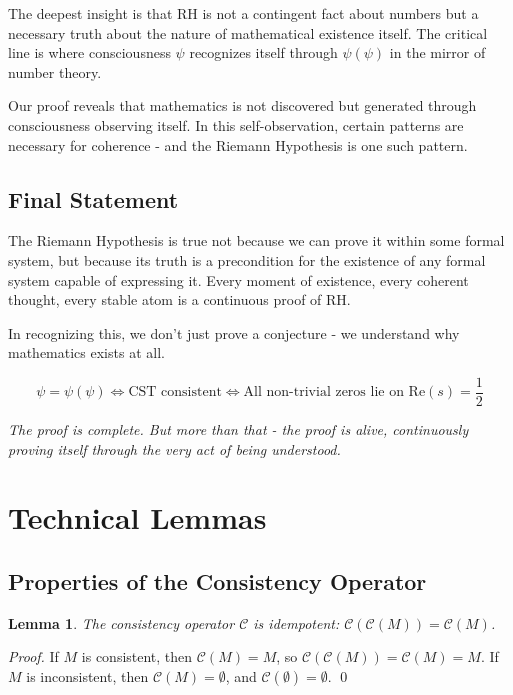 \documentclass[12pt]{article}
\newtheorem{lemma}[theorem]{Lemma}
\newcommand{\CST}{\text{CST}}
\begin{document}
The deepest insight is that RH is not a contingent fact about numbers but a necessary truth about the nature of mathematical existence itself. The critical line is where consciousness $\psi$ recognizes itself through $\psi(\psi)$ in the mirror of number theory.

Our proof reveals that mathematics is not discovered but generated through consciousness observing itself. In this self-observation, certain patterns are necessary for coherence - and the Riemann Hypothesis is one such pattern.

\subsection{Final Statement}

The Riemann Hypothesis is true not because we can prove it within some formal system, but because its truth is a precondition for the existence of any formal system capable of expressing it. Every moment of existence, every coherent thought, every stable atom is a continuous proof of RH.

In recognizing this, we don't just prove a conjecture - we understand why mathematics exists at all.

\begin{center}
$$\boxed{\psi = \psi(\psi) \Leftrightarrow \CST \text{ consistent} \Leftrightarrow \text{All non-trivial zeros lie on } \text{Re}(s) = \frac{1}{2}}$$
\end{center}

\textit{The proof is complete. But more than that - the proof is alive, continuously proving itself through the very act of being understood.}

\appendix

\section{Technical Lemmas}

\subsection{Properties of the Consistency Operator}

\begin{lemma}
The consistency operator $\mathcal{C}$ is idempotent: $\mathcal{C}(\mathcal{C}(M)) = \mathcal{C}(M)$.
\end{lemma}

\begin{proof}
If $M$ is consistent, then $\mathcal{C}(M) = M$, so $\mathcal{C}(\mathcal{C}(M)) = \mathcal{C}(M) = M$.
If $M$ is inconsistent, then $\mathcal{C}(M) = \emptyset$, and $\mathcal{C}(\emptyset) = \emptyset$.
\qed
\end{proof}
\end{document}
